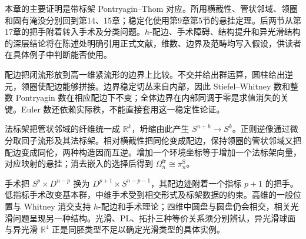 \ProseParagraphBreak

本章的主要证明是带标架 Pontryagin--Thom 对应。所用横截性、管状邻域、领圈和固有淹没分别回到第14、15章；稳定化使用第9章第5节的悬挂定理。后两节从第17章的把手附着转入手术及分类问题。\(h\)-配边、手术障碍、结构提升和异光滑结构的深层结论将在陈述处明确引用正式文献，维数、边界及范畴均写入假设，供读者在具体例子中判断能否使用。






\begin{chaptersummary}
	配边把闭流形放到高一维紧流形的边界上比较。不交并给出群运算，圆柱给出逆元，领圈使配边能够拼接。边界稳定切丛来自内部，因此 Stiefel--Whitney 数和整数 Pontryagin 数在相应配边下不变；全体边界在内部同调于零是求值消失的关键。Euler 数还依赖实际秩，不能直接套用这一稳定性论证。

	\ProseParagraphBreak

	法标架把管状邻域的纤维统一成 \(\mathbb R^k\)，坍缩由此产生 \(S^{n+k}\to S^k\)。正则逆像通过微分取回子流形及其法标架。相对横截性把同伦变成配边，保持领圈的管状邻域又把配边变成同伦，两种构造因而互逆。增加一个环境坐标等于增加一个法标架向量，对应映射的悬挂；消去嵌入的选择后得到 \(\Omega_n^{\mathrm{fr}}\cong\pi_n^{\mathrm S}\)。

	\ProseParagraphBreak

	手术把 \(S^p\times D^{n-p}\) 换为 \(D^{p+1}\times S^{n-p-1}\)，其配边迹附着一个指标 \(p+1\) 的把手。低指标手术改变基本群，中维手术受到相交形式及标架数据的约束。高维的一般位置与 Whitney 消交支持 \(h\)-配边和手术理论；四维中圆盘与圆盘仍会相交，相关光滑问题呈现另一种结构。光滑、PL、拓扑三种等价关系须分别辨认，异光滑球面与异光滑 \(\mathbb R^4\) 正是同胚类型不足以确定光滑类型的具体实例。
\end{chaptersummary}

